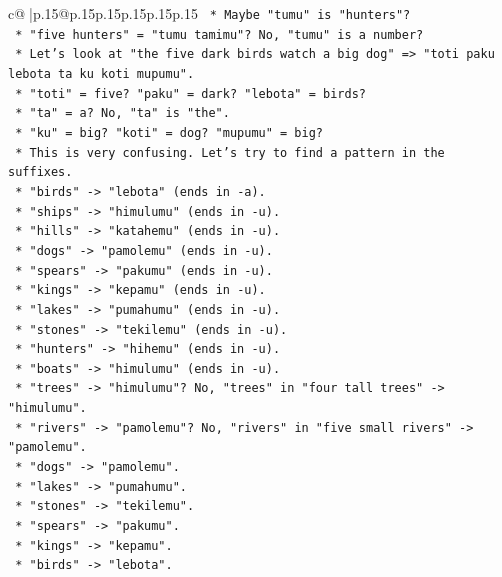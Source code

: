 \documentclass{article}
\begin{document}
{\begin{supertabular}{c@{$\;$}|p{.15\linewidth}@{}p{.15\linewidth}p{.15\linewidth}p{.15\linewidth}p{.15\linewidth}p{.15\linewidth}}
{{{\texttt{        *   Maybe "tumu" is "hunters"?} \\
\texttt{        *   "five hunters" = "tumu tamimu"? No, "tumu" is a number?} \\
\texttt{        *   Let's look at "the five dark birds watch a big dog" => "toti paku lebota ta ku koti mupumu".} \\
\texttt{            *   "toti" = five? "paku" = dark? "lebota" = birds?} \\
\texttt{            *   "ta" = a? No, "ta" is "the".} \\
\texttt{            *   "ku" = big? "koti" = dog? "mupumu" = big?} \\
\texttt{        *   This is very confusing. Let's try to find a pattern in the suffixes.} \\
\texttt{        *   "birds" {-}> "lebota" (ends in {-}a).} \\
\texttt{        *   "ships" {-}> "himulumu" (ends in {-}u).} \\
\texttt{        *   "hills" {-}> "katahemu" (ends in {-}u).} \\
\texttt{        *   "dogs" {-}> "pamolemu" (ends in {-}u).} \\
\texttt{        *   "spears" {-}> "pakumu" (ends in {-}u).} \\
\texttt{        *   "kings" {-}> "kepamu" (ends in {-}u).} \\
\texttt{        *   "lakes" {-}> "pumahumu" (ends in {-}u).} \\
\texttt{        *   "stones" {-}> "tekilemu" (ends in {-}u).} \\
\texttt{        *   "hunters" {-}> "hihemu" (ends in {-}u).} \\
\texttt{        *   "boats" {-}> "himulumu" (ends in {-}u).} \\
\texttt{        *   "trees" {-}> "himulumu"? No, "trees" in "four tall trees" {-}> "himulumu".} \\
\texttt{        *   "rivers" {-}> "pamolemu"? No, "rivers" in "five small rivers" {-}> "pamolemu".} \\
\texttt{        *   "dogs" {-}> "pamolemu".} \\
\texttt{        *   "lakes" {-}> "pumahumu".} \\
\texttt{        *   "stones" {-}> "tekilemu".} \\
\texttt{        *   "spears" {-}> "pakumu".} \\
\texttt{        *   "kings" {-}> "kepamu".} \\
\texttt{        *   "birds" {-}> "lebota".} \\
}}}
\end{supertabular}}
\end{document}
